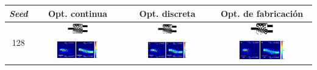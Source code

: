 \begin{landscape}
\begin{table}[ht]
    \centering
    \vspace*{-2.5cm}
    \hspace*{-5cm}
    \begin{tabular}{|c|c|c|c|}
    \hline 
    \emph{Seed} & Opt. continua & Opt. discreta &  Opt. de fabricación \\
    \hline
      \multirow{2}{*}{128} &
      \includegraphics[width=0.24\textwidth]{image/results/wdm/GA/visualize_eps_cont_128.png} &
      \includegraphics[width=0.24\textwidth]{image/results/wdm/GA/visualize_eps_disc_128.png} &
      \includegraphics[width=0.24\textwidth]{image/results/wdm/GA/visualize_eps_fab_128.png} \\
      \cline{2-4}
      &
      \includegraphics[width=0.50\textwidth]{image/results/wdm/GA/visualize_field_cont_128.png} &
      \includegraphics[width=0.50\textwidth]{image/results/wdm/GA/visualize_field_disc_128.png} &
      \includegraphics[width=0.50\textwidth]{image/results/wdm/GA/visualize_field_fab_128.png} \\

\end{tabular}
\end{table}
\end{landscape}
